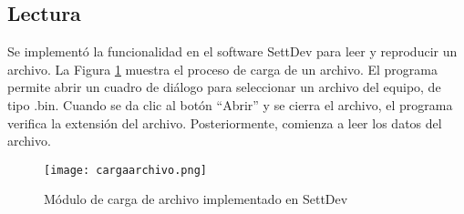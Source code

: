 \subsection{Lectura}

Se implementó la funcionalidad en el software SettDev para leer y reproducir un archivo. La Figura \ref{fig:cargaarchivo} muestra el proceso de carga de un archivo. El programa permite abrir un cuadro de diálogo para seleccionar un archivo del equipo, de tipo .bin. Cuando se da clic al botón ``Abrir'' y se cierra el archivo, el programa verifica la extensión del archivo. Posteriormente, comienza a leer los datos del archivo.

\begin{figure}[htb]
	\centering
	\texttt{[image: cargaarchivo.png]}
	\caption{Módulo de carga de archivo implementado en SettDev}
	\label{fig:cargaarchivo}
\end{figure}